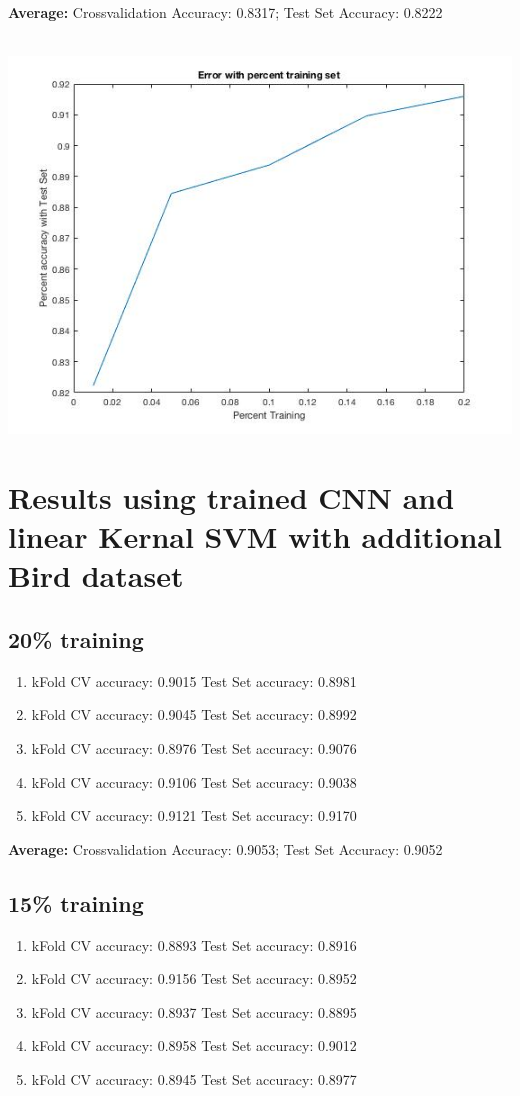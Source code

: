 \documentclass{article}
\begin{document}
	\textbf{Average:} Crossvalidation Accuracy: 0.8317;  Test Set Accuracy: 0.8222
	\\ \\

	\centerline{\includegraphics[scale=0.35]{errorgraph}} 

	\section{Results using trained CNN and linear Kernal SVM with additional Bird dataset}
	\subsection{20\% training}
	\begin{enumerate}
		\item kFold CV accuracy: 0.9015  \indent Test Set accuracy: 0.8981
		\item kFold CV accuracy: 0.9045  \indent Test Set accuracy: 0.8992
		\item kFold CV accuracy: 0.8976  \indent Test Set accuracy: 0.9076
		\item kFold CV accuracy: 0.9106  \indent Test Set accuracy: 0.9038
		\item kFold CV accuracy: 0.9121  \indent Test Set accuracy: 0.9170
	\end{enumerate}

	\textbf{Average:} Crossvalidation Accuracy: 0.9053;  Test Set Accuracy: 0.9052

	\subsection{15\% training}
	\begin{enumerate}
		\item kFold CV accuracy: 0.8893  \indent Test Set accuracy: 0.8916
		\item kFold CV accuracy: 0.9156  \indent Test Set accuracy: 0.8952
		\item kFold CV accuracy: 0.8937  \indent Test Set accuracy: 0.8895
		\item kFold CV accuracy: 0.8958  \indent Test Set accuracy: 0.9012
		\item kFold CV accuracy: 0.8945  \indent Test Set accuracy: 0.8977
	\end{enumerate}
\end{document}
